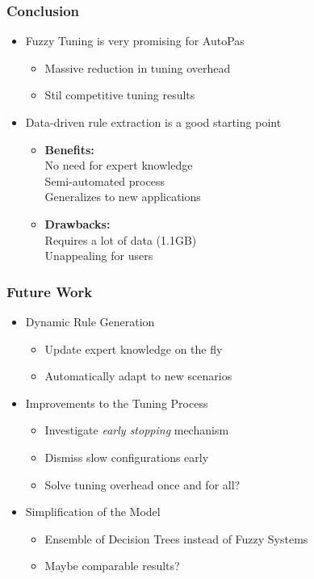 \documentclass[
	10pt,
	t		%
]{beamer}
\newcommand{\xmark}{\ding{55}}%
\newcommand{\cmark}{\ding{51}}%
\begin{document}
\begin{frame}
	\frametitle{Conclusion}
	\begin{itemize}
		\item Fuzzy Tuning is very promising for AutoPas
		      \begin{itemize}
			      \item Massive reduction in tuning overhead
			      \item Stil competitive tuning results
		      \end{itemize}
		      \pause
		\item Data-driven rule extraction is a good starting point
		      \begin{itemize}
			      \item \textbf{Benefits:}\\
			            \quad \cmark \; No need for expert knowledge\\
			            \quad \cmark \; Semi-automated process\\
			            \quad \cmark \; Generalizes to new applications\\
			      \item \textbf{Drawbacks:}\\
			            \quad \xmark \; Requires a lot of data (1.1GB) \\
			            \quad \xmark \; Unappealing for users \\
		      \end{itemize}
		      
	\end{itemize}
\end{frame}


\begin{frame}
	\frametitle{Future Work}
	\begin{itemize}
		\item Dynamic Rule Generation
		      \begin{itemize}
			      \item Update expert knowledge on the fly
			      \item Automatically adapt to new scenarios
		      \end{itemize}
		\item Improvements to the Tuning Process
		      \begin{itemize}
			      \item Investigate \textit{early stopping} mechanism
			      \item Dismiss slow configurations early
			      \item Solve tuning overhead once and for all?
		      \end{itemize}
		\item Simplification of the Model
		      \begin{itemize}
			      \item Ensemble of Decision Trees instead of Fuzzy Systems
			      \item Maybe comparable results?
		      \end{itemize}
	\end{itemize}
\end{frame}
\end{document}
